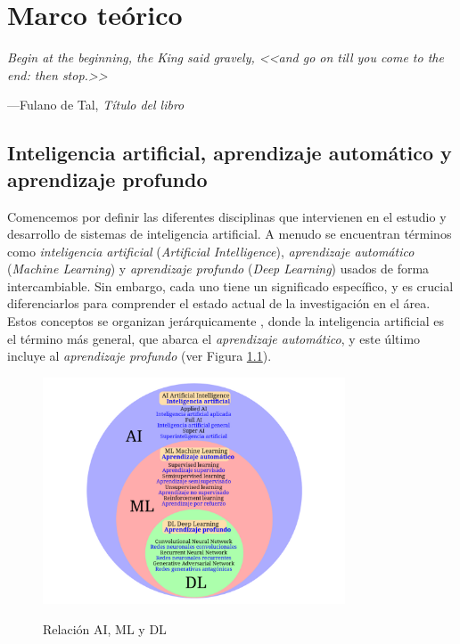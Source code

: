 \chapter{Marco teórico}
\epigraph{\itshape Begin at the beginning, the King said gravely, <<and go on till you come to the end: then stop.>>}{---Fulano de Tal, \textit{Título del libro}}
\section{Inteligencia artificial, aprendizaje automático y aprendizaje profundo}
Comencemos por definir las diferentes disciplinas que intervienen en el estudio y desarrollo de sistemas de inteligencia artificial. A menudo se encuentran términos como \textit{inteligencia artificial} (\textit{Artificial Intelligence}), \textit{aprendizaje automático} (\textit{Machine Learning}) y \textit{aprendizaje profundo} (\textit{Deep Learning}) usados de forma intercambiable. Sin embargo, cada uno tiene un significado específico, y es crucial diferenciarlos para comprender el estado actual de la investigación en el área. Estos conceptos se organizan jerárquicamente \citep{torresivinalsPythonDeepLearning2020}, donde la inteligencia artificial es el término más general, que abarca el \textit{aprendizaje automático}, y este último incluye al \textit{aprendizaje profundo} (ver Figura \ref{fig:ai_ml_dl}).

\begin{figure}[H]
    \caption{Relación AI, ML y DL}
    \centering
    \includegraphics[width=0.8\textwidth]{./figuras/AI_ML_DL.png}
    \label{fig:ai_ml_dl}
\end{figure}

